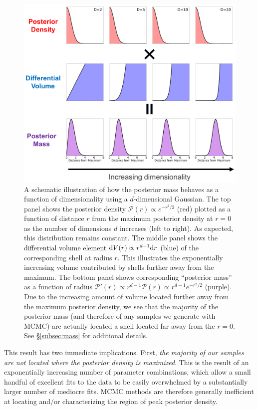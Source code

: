 \documentclass[12pt, titlepage]{article}
\newcommand{\deriv}{\ensuremath{{\rm d}}}  %
\newcommand{\posterior}{\ensuremath{\mathcal{P}}}
\begin{document}
\begin{figure}
\begin{center}
\includegraphics[width=\textwidth]{figures/fig12.png}
\end{center}
\caption{A schematic illustration of how the posterior mass
behaves as a function of dimensionality using a $d$-dimensional
Gaussian. The top panel shows the posterior density 
$\posterior(r) \propto e^{-r^2/2}$ (red) plotted 
as a function of distance $r$ from the maximum posterior density at $r=0$
as the number of dimensions $d$ increases (left to right). As expected,
this distribution remains constant. The middle panel shows
the differential volume element 
$\deriv V(r) \propto r^{d-1} \deriv r$ (blue) of
the corresponding shell at radius $r$. This illustrates the
exponentially increasing volume contributed by shells further
away from the maximum. The bottom panel shows corresponding
``posterior mass'' as a function of radius 
$\posterior'(r) \propto r^{d-1} \posterior(r) \propto r^{d-1} e^{-r^2/2}$ (purple).
Due to the increasing amount of volume located further away from
the maximum posterior density, we see that the majority of the
posterior mass (and therefore of any samples we generate with MCMC)
are actually located a shell located far away from the $r=0$.
See \S\ref{subsec:mass} for additional details.
}\label{fig:mass}
\end{figure}

This result has two immediate implications. First, \textit{the majority
of our samples are not located where the posterior
density is maximized}. This is the result of an exponentially
increasing number of parameter combinations, which allow a
small handful of excellent fits to the data to
be easily overwhelmed by a substantially larger number
of mediocre fits. MCMC methods are therefore generally
inefficient at locating and/or characterizing the region of
peak posterior density.
\end{document}
